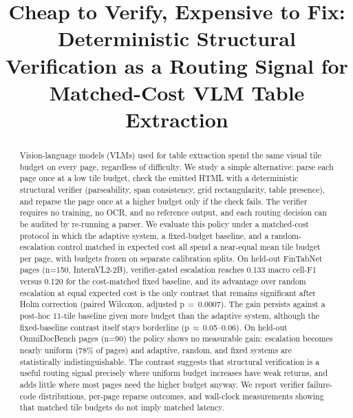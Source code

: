 \documentclass[conference]{IEEEtran}
\begin{document}
\title{Cheap to Verify, Expensive to Fix: Deterministic Structural
Verification as a Routing Signal for Matched-Cost VLM Table Extraction}

\author{}

\maketitle

\begin{abstract}
\normalfont
Vision-language models (VLMs) used for table extraction spend the same
visual tile budget on every page, regardless of difficulty. We study a
simple alternative: parse each page once at a low tile budget, check the
emitted HTML with a deterministic structural verifier (parseability, span
consistency, grid rectangularity, table presence), and reparse the page
once at a higher budget only if the check fails. The verifier requires no
training, no OCR, and no reference output, and each routing decision can
be audited by re-running a parser. We evaluate this policy under a
matched-cost protocol in which the adaptive system, a fixed-budget
baseline, and a random-escalation control matched in expected cost all
spend a near-equal mean tile budget per page, with budgets frozen on
separate calibration splits. On held-out FinTabNet pages (n=150,
InternVL2-2B), verifier-gated escalation reaches 0.133 macro cell-F1
versus 0.120 for the cost-matched fixed baseline, and its advantage over
random escalation at equal expected cost is the only contrast that remains
significant after Holm correction (paired Wilcoxon, adjusted
p\,$=$\,0.0007). The gain persists against a post-hoc 11-tile baseline
given more budget than the adaptive system, although the fixed-baseline
contrast itself stays borderline (p\,$\approx$\,0.05--0.06). On held-out
OmniDocBench pages (n=90) the policy shows no measurable gain: escalation
becomes nearly uniform (78\% of pages) and adaptive, random, and fixed
systems are statistically indistinguishable. The contrast suggests that
structural verification is a useful routing signal precisely where uniform
budget increases have weak returns, and adds little where most pages need
the higher budget anyway. We report verifier failure-code distributions,
per-page reparse outcomes, and wall-clock measurements showing that
matched tile budgets do not imply matched latency.
\end{abstract}
\end{document}
